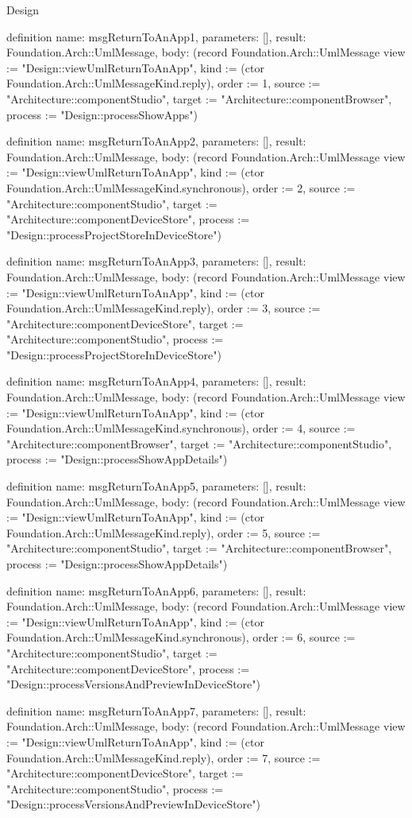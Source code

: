 \begin{lexlean}{Design}
\begin{semanticmodule}
definition{
  name: msgReturnToAnApp1,
  parameters: [],
  result: Foundation.Arch::UmlMessage,
  body: (record Foundation.Arch::UmlMessage {view := "Design::viewUmlReturnToAnApp", kind := (ctor Foundation.Arch::UmlMessageKind.reply), order := 1, source := "Architecture::componentStudio", target := "Architecture::componentBrowser", process := "Design::processShowApps"})
}

definition{
  name: msgReturnToAnApp2,
  parameters: [],
  result: Foundation.Arch::UmlMessage,
  body: (record Foundation.Arch::UmlMessage {view := "Design::viewUmlReturnToAnApp", kind := (ctor Foundation.Arch::UmlMessageKind.synchronous), order := 2, source := "Architecture::componentStudio", target := "Architecture::componentDeviceStore", process := "Design::processProjectStoreInDeviceStore"})
}

definition{
  name: msgReturnToAnApp3,
  parameters: [],
  result: Foundation.Arch::UmlMessage,
  body: (record Foundation.Arch::UmlMessage {view := "Design::viewUmlReturnToAnApp", kind := (ctor Foundation.Arch::UmlMessageKind.reply), order := 3, source := "Architecture::componentDeviceStore", target := "Architecture::componentStudio", process := "Design::processProjectStoreInDeviceStore"})
}

definition{
  name: msgReturnToAnApp4,
  parameters: [],
  result: Foundation.Arch::UmlMessage,
  body: (record Foundation.Arch::UmlMessage {view := "Design::viewUmlReturnToAnApp", kind := (ctor Foundation.Arch::UmlMessageKind.synchronous), order := 4, source := "Architecture::componentBrowser", target := "Architecture::componentStudio", process := "Design::processShowAppDetails"})
}

definition{
  name: msgReturnToAnApp5,
  parameters: [],
  result: Foundation.Arch::UmlMessage,
  body: (record Foundation.Arch::UmlMessage {view := "Design::viewUmlReturnToAnApp", kind := (ctor Foundation.Arch::UmlMessageKind.reply), order := 5, source := "Architecture::componentStudio", target := "Architecture::componentBrowser", process := "Design::processShowAppDetails"})
}

definition{
  name: msgReturnToAnApp6,
  parameters: [],
  result: Foundation.Arch::UmlMessage,
  body: (record Foundation.Arch::UmlMessage {view := "Design::viewUmlReturnToAnApp", kind := (ctor Foundation.Arch::UmlMessageKind.synchronous), order := 6, source := "Architecture::componentStudio", target := "Architecture::componentDeviceStore", process := "Design::processVersionsAndPreviewInDeviceStore"})
}

definition{
  name: msgReturnToAnApp7,
  parameters: [],
  result: Foundation.Arch::UmlMessage,
  body: (record Foundation.Arch::UmlMessage {view := "Design::viewUmlReturnToAnApp", kind := (ctor Foundation.Arch::UmlMessageKind.reply), order := 7, source := "Architecture::componentDeviceStore", target := "Architecture::componentStudio", process := "Design::processVersionsAndPreviewInDeviceStore"})
}


\end{semanticmodule}
\end{lexlean}
